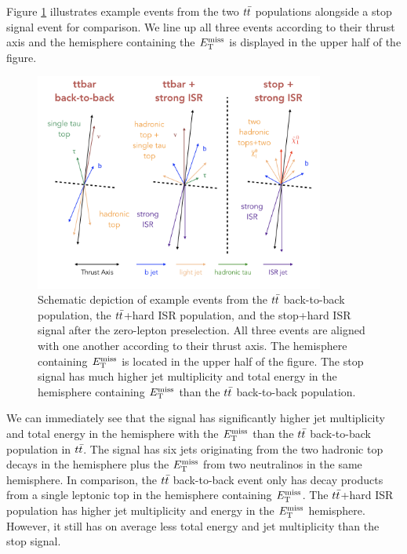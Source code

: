 \indent Figure \ref{fig:ttbar:3pop} illustrates example events from the two $\ttbar$ populations alongside a stop signal event for comparison.  We line up all three events according to their thrust axis and the hemisphere containing the $E_{\mathrm{T}}^{\mathrm{miss}}$ is displayed in the upper half of the figure.  \\

\begin{figure}[h!]
  \centering
	\includegraphics[width=0.85\textwidth]{./figures/strategy/ttbar_vs_signal.png}
\caption[Schematic depiction of example events from the $\ttbar$ back-to-back population, the $\ttbar$+hard ISR population, and the stop+hard ISR signal after the zero-lepton preselection]{Schematic depiction of example events from the $\ttbar$ back-to-back population, the $\ttbar$+hard ISR population, and the stop+hard ISR signal after the zero-lepton preselection.  All three events are aligned with one another according to their thrust axis.  The hemisphere containing $E_{\mathrm{T}}^{\mathrm{miss}}$ is located in the upper half of the figure.  The stop signal has much higher jet multiplicity and total energy in the hemisphere containing $E_{\mathrm{T}}^{\mathrm{miss}}$ than the $\ttbar$ back-to-back population. }
\label{fig:ttbar:3pop}
\end{figure}

\indent We can immediately see that the signal has significantly higher jet multiplicity and total energy in the hemisphere with the $E_{\mathrm{T}}^{\mathrm{miss}}$ than the $\ttbar$ back-to-back population in $\ttbar$.  The signal has six jets originating from the two hadronic top decays in the hemisphere plus the $E_{\mathrm{T}}^{\mathrm{miss}}$ from two neutralinos in the same hemisphere.  In comparison, the $\ttbar$ back-to-back event only has decay products from a single leptonic top in the hemisphere containing $E_{\mathrm{T}}^{\mathrm{miss}}$.   The $\ttbar$+hard ISR population has higher jet multiplicity and energy in the $E_{\mathrm{T}}^{\mathrm{miss}}$ hemisphere. However, it still has on average less total energy and jet multiplicity than the stop signal.  \\

